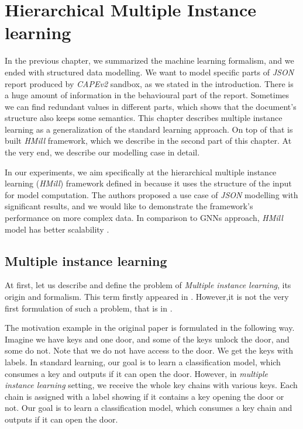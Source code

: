 \chapter{Hierarchical Multiple Instance learning} \label{chap:hmill}
In the previous chapter, we summarized the machine learning formalism, and we ended with structured data modelling. We want to model specific parts of \emph{JSON} report produced by \emph{CAPEv2} sandbox, as we stated in the introduction. There is a huge amount of information in the behavioural part of the report. Sometimes we can find redundant values in different parts, which shows that the document's structure also keeps some semantics. This chapter describes multiple instance learning as a generalization of the standard learning approach. On top of that is built \emph{HMill} framework, which we describe in the second part of this chapter. At the very end, we describe our modelling case in detail.

In our experiments, we aim specifically at the hierarchical multiple instance learning (\emph{HMill}) framework defined in \cite{Mandlik2020} because it uses the structure of the input for model computation. The authors proposed a use case of \emph{JSON} modelling with significant results, and we would like to demonstrate the framework's performance on more complex data. In comparison to GNNs approach, \emph{HMill} model has better scalability \cite{Mandlik2020}. 

\section{Multiple instance learning}
At first, let us describe and define the problem of \emph{Multiple instance learning}, its origin and formalism. This term firstly appeared in \cite{Dietterich1997}. However,it is not the very first formulation of such a problem, that is in \cite{Keeler1991}.

The motivation example in the original paper \cite{Dietterich1997} is formulated in the following way. Imagine we have keys and one door, and some of the keys unlock the door, and some do not. Note that we do not have access to the door. We get the keys with labels. In standard learning, our goal is to learn a classification model, which consumes a key and outputs if it can open the door. However, in \emph{multiple instance learning} setting, we receive the whole key chains with various keys. Each chain is assigned with a label showing if it contains a key opening the door or not. Our goal is to learn a classification model, which consumes a key chain and outputs if it can open the door.

